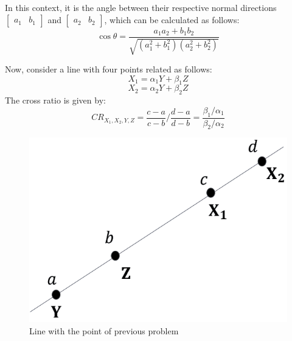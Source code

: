\documentclass[12pt, a4paper]{report}
\begin{document}
    In this context, it is the angle between their respective normal directions $\begin{bmatrix} a_1 & b_1 \end{bmatrix}$ and $\begin{bmatrix} a_2 & b_2 \end{bmatrix}$, which can be calculated as follows:
    \[\cos\theta=\dfrac{a_1a_2+b_1b_2}{\sqrt{\left( a_1^2 + b_1^2 \right)\left( a_2^2 + b_2^2 \right)}}\]
    
    Now, consider a line with four points related as follows:
    \[X_1=\alpha_1Y+\beta_1Z\]
    \[X_2=\alpha_2Y+\beta_2Z\]
    The cross ratio is given by:
    \[CR_{X_1,X_2,Y,Z}=\dfrac{c-a}{c-b}/\dfrac{d-a}{d-b}=\dfrac{\beta_1/\alpha_1}{\beta_2/\alpha_2}\]
    \begin{figure}[H]
        \centering
        \includegraphics[width=0.25\linewidth]{images/line.png}
        \caption{Line with the point of previous problem}
    \end{figure}
\end{document}
